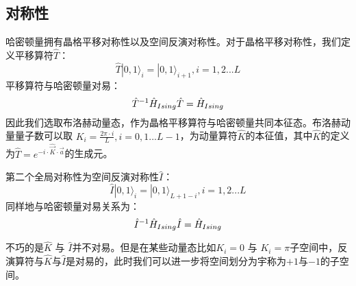 \subsection{对称性}
哈密顿量拥有晶格平移对称性以及空间反演对称性。对于晶格平移对称性，我们定义平移算符$\hat{T}$：
\begin{equation}
	\hat{T} |0,1 \rangle_{i} =  |0,1 \rangle_{i+1}, i=1,2...L
\end{equation}
平移算符与哈密顿量对易：
\begin{equation}
	\hat{T}^{-1}\hat{H}_{Ising}\hat{T} = \hat{H}_{Ising}\\
\end{equation}
因此我们选取布洛赫动量态，作为晶格平移算符与哈密顿量共同本征态。布洛赫动量量子数可以取 $K_i=\frac{2\pi\cdot i}{L},i=0,1...L-1$，为动量算符$\hat{K}$的本征值，其中$\hat{K}$的定义为$\hat{T} = e^{-i\cdot\hat{\vec{K} }\cdot \vec{a}}$的生成元。

第二个全局对称性为空间反演对称性$\hat{I}$：
\begin{equation}
	\hat{I} |0,1 \rangle_{i} =  |0,1 \rangle_{L+1-i}, i=1,2...L
\end{equation}
同样地与哈密顿量对易关系为：
\begin{equation}
	\hat{I}^{-1}\hat{H}_{Ising}\hat{I} = \hat{H}_{Ising}\\
\end{equation}

不巧的是$\hat{K}$ 与 $\hat{I}$并不对易。但是在某些动量态比如$K_i=0$ 与 $K_i=\pi$子空间中，反演算符与$\hat{K}$与$\hat{I}$是对易的，此时我们可以进一步将空间划分为宇称为$+1$与$-1$的子空间。
\begin{comment}
在做了如上所述的块对角化之后，我们将要严格对角化的矩阵维度最大为动量宇称$KP=0+$
子空间的维度$L=18,KP=0+$，此时$D=7685$。
\end{comment}

